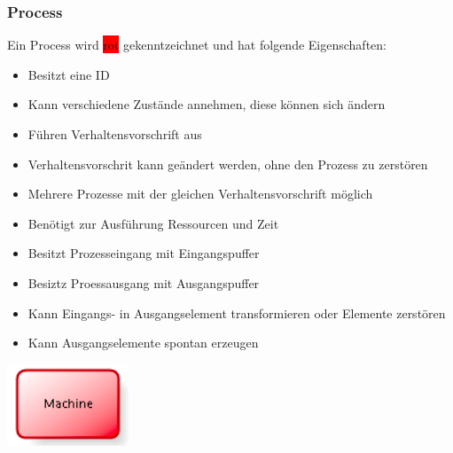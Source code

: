 \subsubsection{Process}
\begin{minipage}[t]{0.7\textwidth}
Ein Process wird \colorbox{red}{rot} gekenntzeichnet und hat folgende Eigenschaften:
\begin{itemize}
    \item Besitzt eine ID
    \item Kann verschiedene Zustände annehmen, diese können sich ändern
    \item Führen Verhaltensvorschrift aus
    \item Verhaltensvorschrit kann geändert werden, ohne den Prozess zu zerstören
    \item Mehrere Prozesse mit der gleichen Verhaltensvorschrift möglich
    \item Benötigt zur Ausführung Ressourcen und Zeit
    \item Besitzt Prozesseingang mit Eingangspuffer
    \item Besiztz Proessausgang mit Ausgangspuffer
    \item Kann Eingangs- in Ausgangselement transformieren oder Elemente zerstören
    \item Kann Ausgangselemente spontan erzeugen
\end{itemize}
\end{minipage}
\begin{minipage}[t]{0.2\textwidth}
\includegraphics[width=0.6\linewidth]{images/simBPMN_process.png}
\end{minipage}

